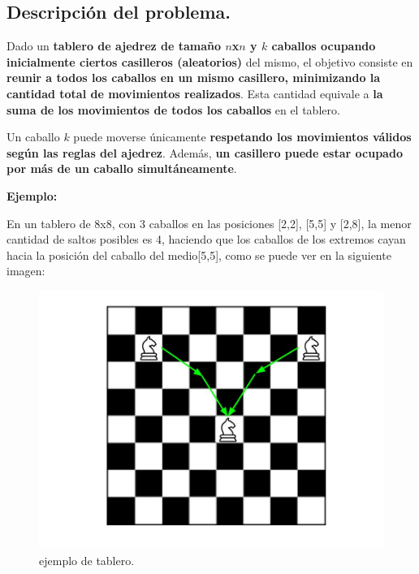 \subsection{Descripción del problema.}

\vspace*{0.3cm}

Dado un \textbf{tablero de ajedrez de tamaño $n$x$n$ y $k$ caballos ocupando
inicialmente ciertos casilleros (aleatorios)} del mismo, el objetivo consiste
en \textbf{reunir a todos los caballos en un mismo casillero, minimizando la
cantidad total de movimientos realizados}. Esta cantidad equivale a
\textbf{la suma de los movimientos de todos los caballos} en el tablero.

Un caballo $k$ puede moverse únicamente \textbf{respetando los movimientos
válidos según las reglas del ajedrez}. Además, \textbf{un casillero puede
estar ocupado por más de un caballo simultáneamente}.

\vspace*{0.5cm}

\textbf{Ejemplo:}

En un tablero de 8x8, con 3 caballos en las posiciones [2,2], [5,5] y [2,8],
la menor cantidad de saltos posibles es 4, haciendo que los caballos de los
extremos cayan hacia la posición del caballo del medio[5,5], como se puede ver
en la siguiente imagen:

\begin{figure}[htb]
  \begin{center}
      \includegraphics[scale=0.25]{imagenes/caballos.jpg}
  \end{center}
  \caption{ejemplo de tablero.}
\end{figure}


